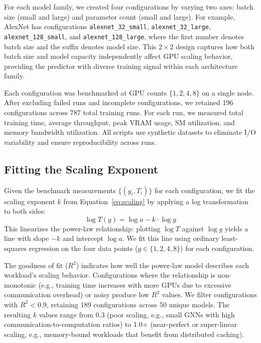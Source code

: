 \documentclass[letterpaper,10pt]{article}
\begin{document}
For each model family, we created four configurations by varying two axes: batch size (small and large) and parameter count (small and large). For example, AlexNet has configurations \texttt{alexnet\_32\_small}, \texttt{alexnet\_32\_large}, \texttt{alexnet\_128\_small}, and \texttt{alexnet\_128\_large}, where the first number denotes batch size and the suffix denotes model size. This $2 \times 2$ design captures how both batch size and model capacity independently affect GPU scaling behavior, providing the predictor with diverse training signal within each architecture family.

Each configuration was benchmarked at GPU counts $\{1, 2, 4, 8\}$ on a single node. After excluding failed runs and incomplete configurations, we retained 196 configurations across 787 total training runs. For each run, we measured total training time, average throughput, peak VRAM usage, SM utilization, and memory bandwidth utilization. All scripts use synthetic datasets to eliminate I/O variability and ensure reproducibility across runs.

\subsection{Fitting the Scaling Exponent}

Given the benchmark measurements $\{(g_i, T_i)\}$ for each configuration, we fit the scaling exponent $k$ from Equation~\ref{eq:scaling} by applying a log transformation to both sides:
\begin{equation}
    \log T(g) = \log a - k \cdot \log g
\end{equation}
This linearizes the power-law relationship: plotting $\log T$ against $\log g$ yields a line with slope $-k$ and intercept $\log a$. We fit this line using ordinary least-squares regression on the four data points ($g \in \{1, 2, 4, 8\}$) for each configuration.

The goodness of fit ($R^2$) indicates how well the power-law model describes each workload's scaling behavior. Configurations where the relationship is non-monotonic (e.g., training time increases with more GPUs due to excessive communication overhead) or noisy produce low $R^2$ values. We filter configurations with $R^2 < 0.9$, retaining 189 configurations across 50 unique models. The resulting $k$ values range from 0.3 (poor scaling, e.g., small GNNs with high communication-to-computation ratios) to 1.0+ (near-perfect or super-linear scaling, e.g., memory-bound workloads that benefit from distributed caching).
\end{document}

